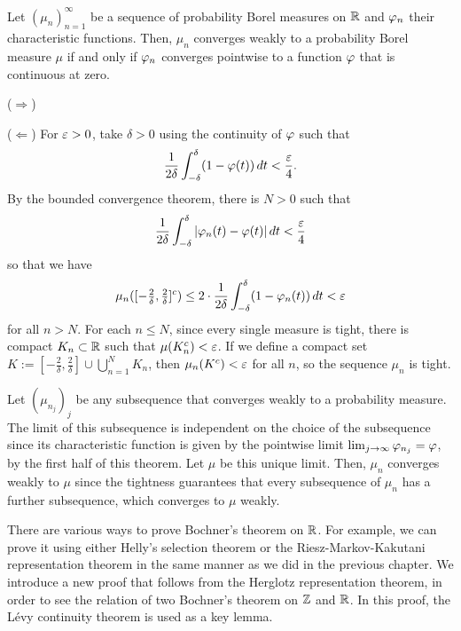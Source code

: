 \documentclass[12pt]{article}
\begin{document}
\begin{thm}
Let $(\mu_n)_{n=1}^\infty$ be a sequence of probability Borel measures on $\mathbb{R}$ and $\varphi_n$ their characteristic functions.
Then, $\mu_n$ converges weakly to a probability Borel measure $\mu$ if and only if $\varphi_n$ converges pointwise to a function $\varphi$ that is continuous at zero.
\end{thm}
\begin{pf}
($\Rightarrow$)

($\Leftarrow$)
For $\varepsilon>0$, take $\delta>0$ using the continuity of $\varphi$ such that
\[\frac1{2\delta}\int_{-\delta}^\delta(1-\varphi(t))\,dt<\frac{\varepsilon}4.\]
By the bounded convergence theorem, there is $N>0$ such that
\[\frac1{2\delta}\int_{-\delta}^\delta|\varphi_n(t)-\varphi(t)|\,dt<\frac{\varepsilon}4\]
so that we have
\[\mu_n([-\tfrac2\delta,\tfrac2\delta]^c)\le2\cdot\frac1{2\delta}\int_{-\delta}^\delta(1-\varphi_n(t))\,dt<\varepsilon\]
for all $n>N$.
For each $n\le N$, since every single measure is tight, there is compact $K_n\subset\mathbb{R}$ such that $\mu(K_n^c)<\varepsilon$.
If we define a compact set $K:=[-\frac2\delta,\frac2\delta]\cup\bigcup_{n=1}^NK_n$, then $\mu_n(K^c)<\varepsilon$ for all $n$, so the sequence $\mu_n$ is tight.

Let $(\mu_{n_j})_j$ be any subsequence that converges weakly to a probability measure.
The limit of this subsequence is independent on the choice of the subsequence since its characteristic function is given by the pointwise limit $\lim_{j\to\infty}\varphi_{n_j}=\varphi$, by the first half of this theorem.
Let $\mu$ be this unique limit.
Then, $\mu_n$ converges weakly to $\mu$ since the tightness guarantees that every subsequence of $\mu_n$ has a further subsequence, which converges to $\mu$ weakly.
\end{pf}


There are various ways to prove Bochner's theorem on $\mathbb{R}$.
For example, we can prove it using either Helly's selection theorem or the Riesz-Markov-Kakutani representation theorem in the same manner as we did in the previous chapter.
We introduce a new proof that follows from the Herglotz representation theorem, in order to see the relation of two Bochner's theorem on $\mathbb{Z}$ and $\mathbb{R}$.
In this proof, the L\'evy continuity theorem is used as a key lemma.
\end{document}
